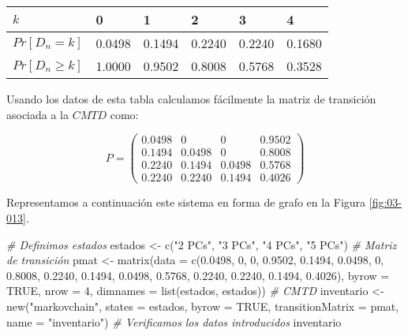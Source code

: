 \documentclass[
]{book}
\newenvironment{Shaded}{\begin{snugshade}}{\end{snugshade}}
\newcommand{\AttributeTok}[1]{\textcolor[rgb]{0.77,0.63,0.00}{#1}}
\newcommand{\CommentTok}[1]{\textcolor[rgb]{0.56,0.35,0.01}{\textit{#1}}}
\newcommand{\ConstantTok}[1]{\textcolor[rgb]{0.00,0.00,0.00}{#1}}
\newcommand{\DecValTok}[1]{\textcolor[rgb]{0.00,0.00,0.81}{#1}}
\newcommand{\FloatTok}[1]{\textcolor[rgb]{0.00,0.00,0.81}{#1}}
\newcommand{\FunctionTok}[1]{\textcolor[rgb]{0.00,0.00,0.00}{#1}}
\newcommand{\NormalTok}[1]{#1}
\newcommand{\OtherTok}[1]{\textcolor[rgb]{0.56,0.35,0.01}{#1}}
\newcommand{\StringTok}[1]{\textcolor[rgb]{0.31,0.60,0.02}{#1}}
\theoremstyle{definition}
\theoremstyle{definition}
\theoremstyle{definition}
\theoremstyle{definition}
\theoremstyle{remark}
\begin{document}
\begin{longtable}[]{@{}llllll@{}}
\toprule
\(k\) & 0 & 1 & 2 & 3 & 4 \\
\midrule
\endhead
\(Pr[D_n = k]\) & 0.0498 & 0.1494 & 0.2240 & 0.2240 & 0.1680 \\
\(Pr[D_n \geq k]\) & 1.0000 & 0.9502 & 0.8008 & 0.5768 & 0.3528 \\
\bottomrule
\end{longtable}

Usando los datos de esta tabla calculamos fácilmente la matriz de transición asociada a la \(CMTD\) como:

\[P = 
\begin{pmatrix}
0.0498 & 0 & 0 & 0.9502\\
0.1494 & 0.0498 & 0 & 0.8008\\
0.2240 & 0.1494 & 0.0498 & 0.5768\\
0.2240 & 0.2240 & 0.1494 & 0.4026
\end{pmatrix}\]

Representamos a continuación este sistema en forma de grafo en la Figura \ref{fig:03-013}.

\begin{Shaded}
\begin{Highlighting}[]
\CommentTok{\# Definimos estados}
\NormalTok{estados }\OtherTok{\textless{}{-}} \FunctionTok{c}\NormalTok{(}\StringTok{"2 PCs"}\NormalTok{, }\StringTok{"3 PCs"}\NormalTok{, }\StringTok{"4 PCs"}\NormalTok{, }\StringTok{"5 PCs"}\NormalTok{)}
\CommentTok{\# Matriz de transición }
\NormalTok{pmat }\OtherTok{\textless{}{-}} \FunctionTok{matrix}\NormalTok{(}\AttributeTok{data =} \FunctionTok{c}\NormalTok{(}\FloatTok{0.0498}\NormalTok{, }\DecValTok{0}\NormalTok{, }\DecValTok{0}\NormalTok{, }\FloatTok{0.9502}\NormalTok{, }
                        \FloatTok{0.1494}\NormalTok{, }\FloatTok{0.0498}\NormalTok{, }\DecValTok{0}\NormalTok{, }\FloatTok{0.8008}\NormalTok{,  }
                        \FloatTok{0.2240}\NormalTok{, }\FloatTok{0.1494}\NormalTok{, }\FloatTok{0.0498}\NormalTok{, }\FloatTok{0.5768}\NormalTok{,}
                        \FloatTok{0.2240}\NormalTok{, }\FloatTok{0.2240}\NormalTok{, }\FloatTok{0.1494}\NormalTok{, }\FloatTok{0.4026}\NormalTok{), }
               \AttributeTok{byrow =} \ConstantTok{TRUE}\NormalTok{, }\AttributeTok{nrow =} \DecValTok{4}\NormalTok{, }
               \AttributeTok{dimnames =} \FunctionTok{list}\NormalTok{(estados, estados))}
\CommentTok{\# CMTD}
\NormalTok{inventario }\OtherTok{\textless{}{-}} \FunctionTok{new}\NormalTok{(}\StringTok{"markovchain"}\NormalTok{, }\AttributeTok{states =}\NormalTok{ estados, }
                 \AttributeTok{byrow =} \ConstantTok{TRUE}\NormalTok{, }\AttributeTok{transitionMatrix =}\NormalTok{ pmat, }
                 \AttributeTok{name =} \StringTok{"inventario"}\NormalTok{)}
\CommentTok{\# Verificamos los datos introducidos}
\NormalTok{inventario}
\end{Highlighting}
\end{Shaded}
\end{document}
